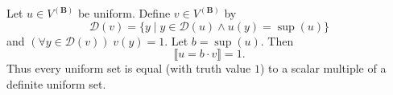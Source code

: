Let $u \in V^{(\mathbf{B})}$ be uniform. Define $v \in V^{(\mathbf{B})}$ by
$$\mathcal{D}(v) = \{y \mid y \in \mathcal{D}(u) \land u(y) = \sup(u)\}$$
and $(\forall y \in \mathcal{D}(v))\; v(y) = 1$. Let $b = \sup(u)$. Then
$$\llbracket u = b \cdot v \rrbracket = 1.$$
Thus every uniform set is equal (with truth value $1$) to a scalar multiple of a definite uniform set.
